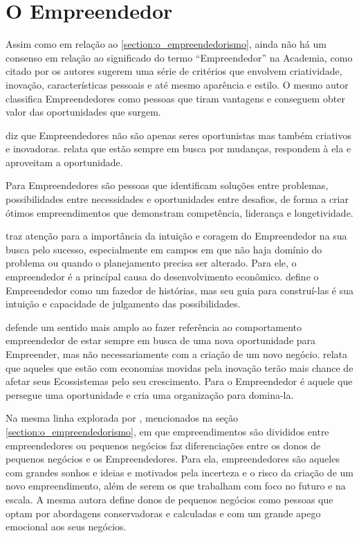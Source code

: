 \section{O Empreendedor}
\label{section:o_empreendedor}

Assim como em relação ao \ref{section:o_empreendedorismo}, ainda não há um consenso em relação ao significado do termo ``Empreendedor'' na Academia, como citado por  os autores sugerem uma série de critérios que envolvem criatividade, inovação, características pessoais e até mesmo aparência e estilo. O mesmo autor classifica Empreendedores como pessoas que tiram vantagens e conseguem obter valor das oportunidades que surgem.

 diz que Empreendedores não são apenas seres oportunistas mas também criativos e inovadoras.  relata que estão sempre em busca por mudanças, respondem à ela e aproveitam a oportunidade.

Para  Empreendedores são pessoas que identificam soluções entre problemas, possibilidades entre necessidades e oportunidades entre desafios, de forma a criar ótimos empreendimentos que demonstram competência, liderança e longetividade. 

 traz atenção para a importância da intuição e coragem do Empreendedor na sua busca pelo sucesso, especialmente em campos em que não haja domínio do problema ou quando o planejamento precisa ser alterado. Para ele, o empreendedor é a princípal causa do desenvolvimento econômico.  define o Empreendedor como um fazedor de histórias, mas seu guia para construí-las é sua intuição e capacidade de julgamento das possibilidades.

 defende um sentido mais amplo ao fazer referência ao comportamento empreendedor de estar sempre em busca de uma nova oportunidade para Empreender, mas não necessariamente com a criação de um novo negócio.  relata que aqueles que estão com economias movidas pela inovação terão mais chance de afetar seus Ecossistemas pelo seu crescimento. Para  o Empreendedor é aquele que persegue uma oportunidade e cria uma organização para domina-la.

Na mesma linha explorada por , mencionados na seção \ref{section:o_empreendedorismo}, em que empreendimentos são divididos entre empreendedores ou pequenos negócios  faz diferenciações entre os donos de pequenos negócios e os Empreendedores. Para ela, empreendedores são aqueles com grandes sonhos e ideias e motivados pela incerteza e o risco da criação de um novo empreendimento, além de serem os que trabalham com foco no futuro e na escala. A mesma autora define donos de pequenos negócios como pessoas que optam por abordagens conservadoras e calculadas e com um grande apego emocional aos seus negócios.

